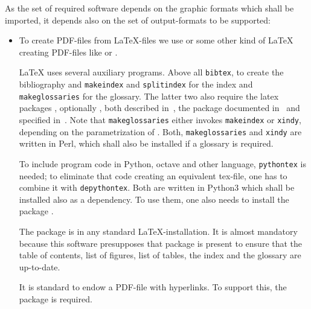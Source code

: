 As the set of required software depends on the graphic formats 
which shall be imported, 
it depends also on the set of output-formats 
to be supported: 
%
\begin{itemize}
\item
To create PDF-files from \LaTeX-files we use \lualatex{} 
or some other kind of \LaTeX{} creating PDF-files 
like \xelatex{} or \pdflatex{}. 

\LaTeX{} uses several auxiliary programs. 
Above all \texttt{bibtex}, to create the bibliography 
and \texttt{makeindex} and \texttt{splitindex} for the index 
and \texttt{makeglossaries} for the glossary. 
The latter two 
also require the latex packages , optionally , 
both described in~\cite{MkidxShIdxP}, 
the package  documented in~\cite{SplitidxP}
and  specified in~\cite{GloP}. 
Note that \texttt{makeglossaries} either invokes \texttt{makeindex} 
or \texttt{xindy}, depending on the parametrization of . 
Both, \texttt{makeglossaries} and \texttt{xindy} are written in Perl, 
which shall also be installed if a glossary is required. 

To include program code in Python, octave and other language, 
\texttt{pythontex} is needed; to eliminate that code creating an equivalent tex-file, 
one has to combine it with \texttt{depythontex}. 
Both are written in Python3 which shall be installed also as a dependency. 
To use them, one also needs to install the package . 

The package  is in any standard \LaTeX-installation. 
It is almost mandatory 
because this software presupposes that package is present  
to ensure that the table of contents, list of figures, list of tables, 
the index and the glossary are up-to-date. 

It is standard to endow a PDF-file with hyperlinks. 
To support this, the package  is required. 


\end{itemize}
